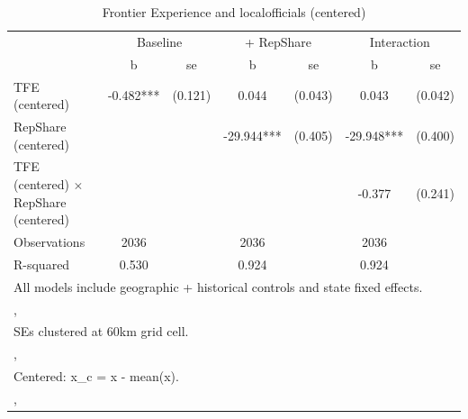 \begin{table}[htbp]\centering
\def\sym#1{\ifmmode^{#1}\else\(^{#1}\)\fi}
\caption{Frontier Experience and localofficials (centered)}
\begin{tabular}{l*{3}{cc}}
\toprule
                &\multicolumn{2}{c}{Baseline}&\multicolumn{2}{c}{ + RepShare}&\multicolumn{2}{c}{Interaction}\\
                &        b   &       se&        b   &       se&        b   &       se\\
\midrule
TFE (centered)  &   -0.482***&  (0.121)&    0.044   &  (0.043)&    0.043   &  (0.042)\\
RepShare (centered)&            &         &  -29.944***&  (0.405)&  -29.948***&  (0.400)\\
TFE (centered) $\times$ RepShare (centered)&            &         &            &         &   -0.377   &  (0.241)\\
\midrule
Observations    &     2036   &         &     2036   &         &     2036   &         \\
R-squared       &    0.530   &         &    0.924   &         &    0.924   &         \\
\bottomrule
\multicolumn{7}{l}{\footnotesize All models include geographic + historical controls and state fixed effects.}\\
\multicolumn{7}{l}{\footnotesize ,}\\
\multicolumn{7}{l}{\footnotesize SEs clustered at 60km grid cell.}\\
\multicolumn{7}{l}{\footnotesize ,}\\
\multicolumn{7}{l}{\footnotesize Centered: x\_c = x - mean(x).}\\
\multicolumn{7}{l}{\footnotesize ,}\\
\end{tabular}
\end{table}
